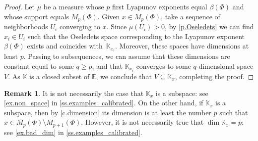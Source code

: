 \documentclass[JEP,XML,SOM,Unicode]{cedram}
\theoremstyle{plain}
\theoremstyle{definition}
\newtheorem{remark}[theorem]{Remark}
\newcommand{\EE}{\mathbb{E}}
\newcommand{\KK}{\mathbb{K}}
\begin{document}
\begin{proof}
Let $\mu$ be a measure whose $p$ first Lyapunov exponents equal $\beta(\Phi)$ and whose support equals $M_p(\Phi)$.
Given $x \in M_p(\Phi)$, take a sequence of neighborhoods $U_i$ converging to $x$.
Since $\mu(U_i)>0$, by \cref{p.Oseledets} we can find $x_i \in U_i$ such that the Oseledets space corresponding to the Lyapunov exponent $\beta(\Phi)$ exists and coincides with~$\KK_{x_i}$. Moreover, these spaces have dimensions at least $p$.
Passing to subsequences, we can assume that these dimensions are constant equal to some $q \ge p$, and that $\KK_{x_i}$ converges to some $q$-dimensional space $V$. As $\KK$ is a closed subset of $\EE$, we conclude that $V \subseteq \KK_x$, completing the proof.
\end{proof}

\begin{remark}\label{r.exceptional_fibers}
It is not necessarily the case that $\KK_x$ is a subspace: see \cref{ex.non_space} in \cref{ss.examples_calibrated}.
On the other hand, if $\KK_x$ is a subspace, then by \cref{c.dimension} its dimension is at least the number $p$ such that $x \in M_p(\Phi) \setminus M_{p+1}(\Phi)$.
However, it is not necessarily true that $\dim \KK_x = p$: see \cref{ex.bad_dim} in \cref{ss.examples_calibrated}.
\end{remark}
\end{document}
